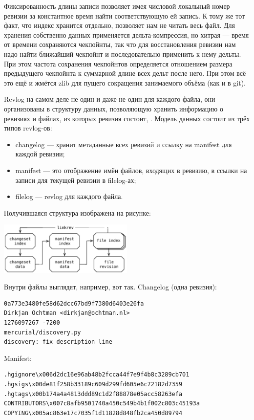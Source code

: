 \documentclass[a5paper]{article}
\begin{document}
Фиксированность длины записи позволяет имея числовой локальный номер ревизии за константное время найти соответствующую ей запись. К тому же тот факт, что индекс хранится отдельно, позволяет нам не читать весь файл. Для хранения собственно данных применяется дельта-компрессия, но хитрая --- время от времени сохраняются чекпойнты, так что для восстановления ревизии нам надо найти ближайший чекпойнт и последовательно применить к нему дельты. При этом частота сохранения чекпойнтов определяется отношением размера предыдущего чекпойнта к суммарной длине всех дельт после него. При этом всё это ещё и жмётся zlib для пущего сокращения занимаемого объёма (как и в git).

Revlog на самом деле не один и даже не один для каждого файла, они организованы в структуру данных, позволяющую хранить информацию о ревизиях и файлах, из которых ревизия состоит, . Модель данных состоит из трёх типов revlog-ов:

\begin{itemize}
	\item changelog --- хранит метаданные всех ревизий и ссылку на manifest для каждой ревизии;
	\item manifest --- это отображение имён файлов, входящих в ревизию, в ссылки на записи для текущей ревизии в filelog-ах;
	\item filelog --- revlog для каждого файла.
\end{itemize}

Получившаяся структура изображена на рисунке:

\begin{center}
	\includegraphics[width=0.5\textwidth]{mercurialLogStructure.png}
\end{center}

Внутри файлы выглядят, например, вот так. Changelog (одна ревизия):

\begin{verbatim}
0a773e3480fe58d62dcc67bd9f7380d6403e26fa
Dirkjan Ochtman <dirkjan@ochtman.nl>
1276097267 -7200
mercurial/discovery.py
discovery: fix description line
\end{verbatim}

Manifest:
\begin{verbatim}
.hgignore\x006d2dc16e96ab48b2fcca44f7e9f4b8c3289cb701
.hgsigs\x00de81f258b33189c609d299fd605e6c72182d7359
.hgtags\x00b174a4a4813ddd89c1d2f88878e05acc58263efa
CONTRIBUTORS\x007c8afb9501740a450c549b4b1f002c803c45193a
COPYING\x005ac863e17c7035f1d11828d848fb2ca450d89794
\end{verbatim}
\end{document}
